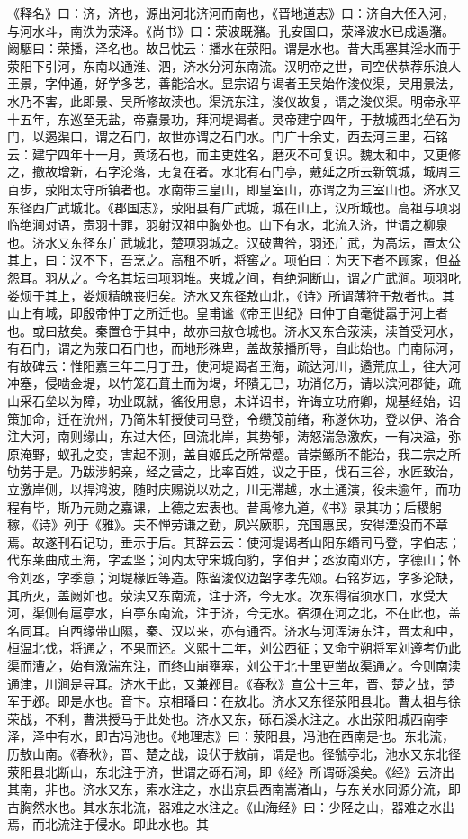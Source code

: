 \documentclass[12pt,UTF8]{ctexbook}
\begin{document}
《释名》曰：济，济也，源出河北济河而南也，《晋地道志》曰：济自大伾入河，与河水斗，南泆为荥泽。《尚书》曰：荥波既潴。孔安国曰，荥泽波水已成遏潴。阚駰曰：荣播，泽名也。故吕忱云：播水在荥阳。谓是水也。昔大禹塞其淫水而于荥阳下引河，东南以通淮、泗，济水分河东南流。汉明帝之世，司空伏恭荐乐浪人王景，字仲通，好学多艺，善能洽水。显宗诏与谒者王吴始作浚仪渠，吴用景法，水乃不害，此即景、吴所修故渎也。渠流东注，浚仪故复，谓之浚仪渠。明帝永平十五年，东巡至无盐，帝嘉景功，拜河堤谒者。灵帝建宁四年，于敖城西北垒石为门，以遏渠口，谓之石门，故世亦谓之石门水。门广十余丈，西去河三里，石铭云：建宁四年十一月，黄场石也，而主吏姓名，磨灭不可复识。魏太和中，又更修之，撤故增新，石字沦落，无复在者。水北有石门亭，戴延之所云新筑城，城周三百步，荥阳太守所镇者也。水南带三皇山，即皇室山，亦谓之为三室山也。济水又东径西广武城北。《郡国志》，荥阳县有广武城，城在山上，汉所城也。高祖与项羽临绝涧对语，责羽十罪，羽射汉祖中胸处也。山下有水，北流入济，世谓之柳泉也。济水又东径东广武城北，楚项羽城之。汉破曹咎，羽还广武，为高坛，置太公其上，曰：汉不下，吾烹之。高租不听，将窖之。项伯曰：为天下者不顾家，但益怨耳。羽从之。今名其坛曰项羽堆。夹城之间，有绝洞断山，谓之广武涧。项羽叱娄烦于其上，娄烦精魄丧归矣。济水又东径敖山北，《诗》所谓薄狩于敖者也。其山上有城，即殷帝仲丁之所迁也。皇甫谧《帝王世纪》曰仲丁自毫徙嚣于河上者也。或曰敖矣。秦置仓于其中，故亦曰敖仓城也。济水又东合荥渎，渎首受河水，有石门，谓之为荥口石门也，而地形殊卑，盖故荥播所导，自此始也。门南际河，有故碑云：惟阳嘉三年二月丁丑，使河堤谒者王海，疏达河川，遹荒庶土，往大河冲塞，侵啮金堤，以竹笼石葺土而为堨，坏隤无已，功消亿万，请以滨河郡徒，疏山采石垒以为障，功业既就，徭役用息，未详诏书，许诲立功府卿，规基经始，诏策加命，迁在沇州，乃简朱轩授使司马登，令缵茂前绪，称遂休功，登以伊、洛合注大河，南则缘山，东过大伾，回流北岸，其势郁，涛怒湍急激疾，一有决溢，弥原淹野，蚁孔之变，害起不测，盖自姬氏之所常蹙。昔崇鲧所不能治，我二宗之所劬劳于是。乃跋涉躬亲，经之营之，比率百姓，议之于臣，伐石三谷，水匠致治，立激岸侧，以捍鸿波，随时庆赐说以劝之，川无滞越，水土通演，役未逾年，而功程有毕，斯乃元勋之嘉课，上德之宏表也。昔禹修九道，《书》录其功；后稷躬稼，《诗》列于《雅》。夫不惮劳谦之勤，夙兴厥职，充国惠民，安得湮没而不章焉。故遂刊石记功，垂示于后。其辞云云：使河堤谒者山阳东缗司马登，字伯志；代东莱曲成王海，字孟坚；河内太守宋城向豹，字伯尹；丞汝南邓方，字德山；怀令刘丞，字季意；河堤椽匠等造。陈留浚仪边韶字孝先颂。石铭岁远，字多沦缺，其所灭，盖阙如也。荥渎又东南流，注于济，今无水。次东得宿须水口，水受大河，渠侧有扈亭水，自亭东南流，注于济，今无水。宿须在河之北，不在此也，盖名同耳。自西缘带山隰，秦、汉以来，亦有通否。济水与河浑涛东注，晋太和中，桓温北伐，将通之，不果而还。义熙十二年，刘公西征；又命宁朔将军刘遵考仍此渠而漕之，始有激湍东注，而终山崩壅塞，刘公于北十里更凿故渠通之。今则南渎通津，川涧是导耳。济水于此，又兼邲目。《春秋》宣公十三年，晋、楚之战，楚军于邲。即是水也。音卞。京相璠曰：在敖北。济水又东径荥阳县北。曹太祖与徐荣战，不利，曹洪授马于此处也。济水又东，砾石溪水注之。水出荥阳城西南李泽，泽中有水，即古冯池也。《地理志》曰：荥阳县，冯池在西南是也。东北流，历敖山南。《春秋》，晋、楚之战，设伏于敖前，谓是也。径虢亭北，池水又东北径荥阳县北断山，东北注于济，世谓之砾石涧，即《经》所谓砾溪矣。《经》云济出其南，非也。济水又东，索水注之，水出京县西南嵩渚山，与东关水同源分流，即古胸然水也。其水东北流，器难之水注之。《山海经》曰：少陉之山，器难之水出焉，而北流注于侵水。即此水也。其
\end{document}
